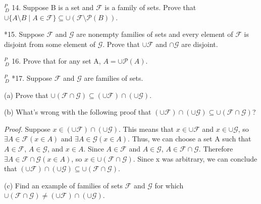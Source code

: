 \documentclass{article}
\begin{document}
\vspace{30pt}

$^{\textit{P}}_{\, \textit{D}}$ 14. Suppose B is a set and $\mathcal{F}$ is a family of sets. Prove that $\cup\{A \setminus B \mid A \in \mathcal{F}\} \subseteq \cup(\mathcal{F} \setminus \mathcal{P} (B))$.
\vspace{30pt}



\vspace{30pt}

*15. Suppose $\mathcal{F}$ and $\mathcal{G}$ are nonempty families of sets and every element of $\mathcal{F}$
is disjoint from some element of $\mathcal{G}$. Prove that $\cup \mathcal{F}$ and $\cap \mathcal{G}$ are disjoint.
\vspace{30pt}



\vspace{30pt}

$^{\textit{P}}_{\, \textit{D}}$ 16. Prove that for any set A, $A = \cup \mathcal{P} (A)$.
\vspace{30pt}



\vspace{30pt}

$^{\textit{P}}_{\, \textit{D}}$ *17. Suppose $\mathcal{F}$ and $\mathcal{G}$ are families of sets.


\hspace{12pt}(a) Prove that $\cup (\mathcal{F} \cap \mathcal{G}) \subseteq (\cup\mathcal{F}) \cap (\cup\mathcal{G})$.

\hspace{12pt}(b) What's wrong with the following proof that $(\cup \mathcal{F}) \cap (\cup \mathcal{G}) \subseteq
\cup(\mathcal{F} \cap \mathcal{G})$?

\textit{Proof.} Suppose $x \in (\cup\mathcal{F}) \cap (\cup\mathcal{G})$. This means that $x \in \cup \mathcal{F}$ and $x \in \cup \mathcal{G}$, so $\exists A \in \mathcal{F}(x \in A)$ and $\exists A \in \mathcal{G}(x \in A)$. Thus, we can choose a set A such that $A \in \mathcal{F}$, $A \in \mathcal{G}$, and $x \in A$. Since $A \in \mathcal{F}$ and $A \in \mathcal{G}$, $A \in \mathcal{F} \cap \mathcal{G}$. Therefore $\exists A \in \mathcal{F} \cap \mathcal{G}(x \in A)$, so $x \in \cup(\mathcal{F} \cap \mathcal{G})$. Since x was arbitrary, we can conclude that $(\cup\mathcal{F}) \cap (\cup\mathcal{G}) \subseteq \cup(\mathcal{F} \cap \mathcal{G})$.

\hspace{12pt}(c) Find an example of families of sets $\mathcal{F}$ and $\mathcal{G}$ for which $\cup (\mathcal{F} \cap \mathcal{G}) \neq (\cup\mathcal{F}) \cap (\cup\mathcal{G})$.
\vspace{30pt}
\end{document}

